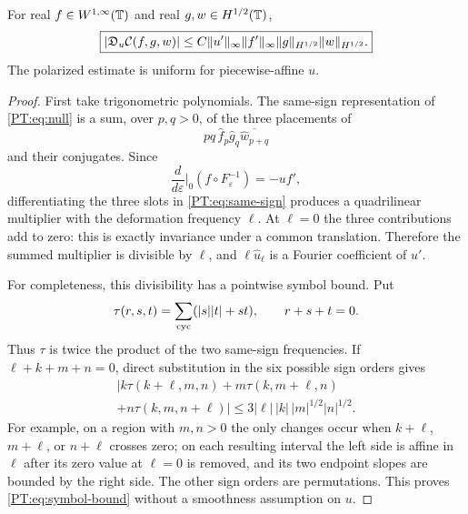 \begin{lemma}\label{PT:lem:covariance}
For real $f\in W^{1,\infty}(\mathbb T)$ and real
$g,w\in H^{1/2}(\mathbb T)$,
\begin{equation}\label{PT:eq:covariance}
 \boxed{
 |\mathfrak D_u\mathcal C(f,g,w)|
 \le C\|u'\|_\infty\|f'\|_\infty
       \|g\|_{H^{1/2}}\|w\|_{H^{1/2}}.}
\end{equation}
The polarized estimate is uniform for piecewise-affine $u$.
\end{lemma}

\begin{proof}
First take trigonometric polynomials.  The same-sign representation of
\eqref{PT:eq:null} is a sum, over $p,q>0$, of the three placements of
\begin{equation}\label{PT:eq:same-sign}
 pq\,\widehat f_p\widehat g_q\overline{\widehat w_{p+q}}
\end{equation}
and their conjugates.  Since
\[
 \frac d{d\varepsilon}\bigg|_0
 (f\circ F_\varepsilon^{-1})=-uf',
\]
differentiating the three slots in \eqref{PT:eq:same-sign} produces a
quadrilinear multiplier with the deformation frequency $\ell$.  At
$\ell=0$ the three contributions add to zero: this is exactly invariance
under a common translation.  Therefore the summed multiplier is divisible
by $\ell$, and $\ell\widehat u_\ell$ is a Fourier coefficient of $u'$.

For completeness, this divisibility has a pointwise symbol bound.  Put
\[
 \tau(r,s,t)=\sum_{\rm cyc}(|s||t|+st),
 \qquad r+s+t=0.
\]
Thus $\tau$ is twice the product of the two same-sign frequencies.  If
$\ell+k+m+n=0$, direct substitution in the six possible sign orders gives
\begin{multline}\label{PT:eq:symbol-bound}
 \big|k\tau(k+\ell,m,n)+m\tau(k,m+\ell,n)\\
       +n\tau(k,m,n+\ell)\big|
 \le3|\ell|\,|k|\,|m|^{1/2}|n|^{1/2}.
\end{multline}
For example, on a region with $m,n>0$ the only changes occur when
$k+\ell$, $m+\ell$, or $n+\ell$ crosses zero; on each resulting interval
the left side is affine in $\ell$ after its zero value at $\ell=0$ is
removed, and its two endpoint slopes are bounded by the right side.
The other sign orders are permutations.  This proves
\eqref{PT:eq:symbol-bound} without a smoothness assumption on $u$.


\end{proof}

